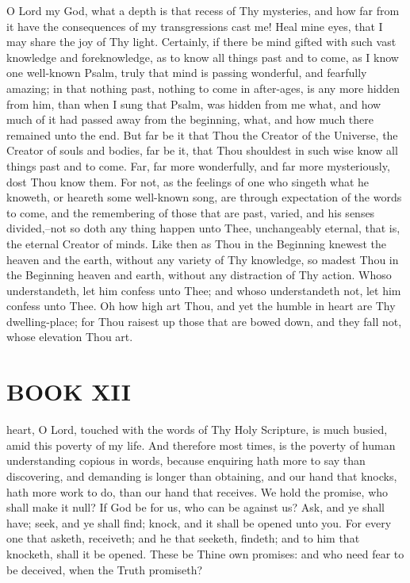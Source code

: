 \documentclass[b5paper,openright,12pt,twoside]{book}
\begin{document}
O Lord my God, what a depth is that recess of Thy mysteries, and how far
from it have the consequences of my transgressions cast me! Heal mine
eyes, that I may share the joy of Thy light. Certainly, if there be mind
gifted with such vast knowledge and foreknowledge, as to know all things
past and to come, as I know one well-known Psalm, truly that mind is
passing wonderful, and fearfully amazing; in that nothing past, nothing
to come in after-ages, is any more hidden from him, than when I sung
that Psalm, was hidden from me what, and how much of it had passed away
from the beginning, what, and how much there remained unto the end. But
far be it that Thou the Creator of the Universe, the Creator of souls
and bodies, far be it, that Thou shouldest in such wise know all things
past and to come. Far, far more wonderfully, and far more mysteriously,
dost Thou know them. For not, as the feelings of one who singeth what he
knoweth, or heareth some well-known song, are through expectation of the
words to come, and the remembering of those that are past, varied,
and his senses divided,--not so doth any thing happen unto Thee,
unchangeably eternal, that is, the eternal Creator of minds. Like then
as Thou in the Beginning knewest the heaven and the earth, without any
variety of Thy knowledge, so madest Thou in the Beginning heaven and
earth, without any distraction of Thy action. Whoso understandeth, let
him confess unto Thee; and whoso understandeth not, let him confess
unto Thee. Oh how high art Thou, and yet the humble in heart are Thy
dwelling-place; for Thou raisest up those that are bowed down, and they
fall not, whose elevation Thou art.




\chapter{BOOK XII}


 heart, O Lord, touched with the words of Thy Holy Scripture, is much
busied, amid this poverty of my life. And therefore most times, is the
poverty of human understanding copious in words, because enquiring hath
more to say than discovering, and demanding is longer than obtaining,
and our hand that knocks, hath more work to do, than our hand that
receives. We hold the promise, who shall make it null? If God be for us,
who can be against us? Ask, and ye shall have; seek, and ye shall find;
knock, and it shall be opened unto you. For every one that asketh,
receiveth; and he that seeketh, findeth; and to him that knocketh,
shall it be opened. These be Thine own promises: and who need fear to be
deceived, when the Truth promiseth?
\end{document}
